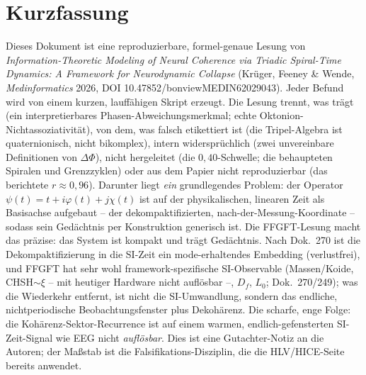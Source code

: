 
\section*{Kurzfassung}
Dieses Dokument ist eine reproduzierbare, formel-genaue Lesung von \emph{Information-Theoretic
Modeling of Neural Coherence via Triadic Spiral-Time Dynamics: A Framework for
Neurodynamic Collapse} (Kr\"uger, Feeney \& Wende, \emph{Medinformatics} 2026,
DOI 10.47852/bonviewMEDIN62029043). Jeder Befund wird von einem kurzen, lauffähigen
Skript erzeugt. Die Lesung trennt, was trägt (ein interpretierbares
Phasen-Abweichungsmerkmal; echte Oktonion-Nichtassoziativität), von dem, was falsch
etikettiert ist (die Tripel-Algebra ist quaternionisch, nicht bikomplex), intern
widersprüchlich (zwei unvereinbare Definitionen von $\Delta\Phi$), nicht hergeleitet
(die $0{,}40$-Schwelle; die behaupteten Spiralen und Grenzzyklen) oder aus dem Papier
nicht reproduzierbar (das berichtete $r\approx0{,}96$). Darunter liegt \emph{ein}
grundlegendes Problem: der Operator $\psi(t)=t+i\varphi(t)+j\chi(t)$ ist auf der
physikalischen, linearen Zeit als Basisachse aufgebaut -- der dekompaktifizierten,
nach-der-Messung-Koordinate -- sodass sein Gedächtnis per Konstruktion generisch ist.
Die FFGFT-Lesung macht das präzise: das System ist kompakt und trägt Gedächtnis. Nach
Dok.~270 ist die Dekompaktifizierung in die SI-Zeit ein mode-erhaltendes Embedding
(verlustfrei), und FFGFT hat sehr wohl framework-spezifische SI-Observable
(Massen/Koide, CHSH$\sim\xi$ -- mit heutiger Hardware nicht auflösbar --, $D_f$, $L_0$; Dok.~270/249); was die Wiederkehr entfernt,
ist nicht die SI-Umwandlung, sondern das endliche, nichtperiodische Beobachtungsfenster
plus Dekohärenz. Die scharfe, enge Folge: die Kohärenz-Sektor-Recurrence ist auf einem
warmen, endlich-gefensterten SI-Zeit-Signal wie EEG nicht \emph{auflösbar}. Dies
ist eine Gutachter-Notiz an die Autoren; der Maßstab ist die Falsifikations-Disziplin,
die die HLV/HICE-Seite bereits anwendet.

